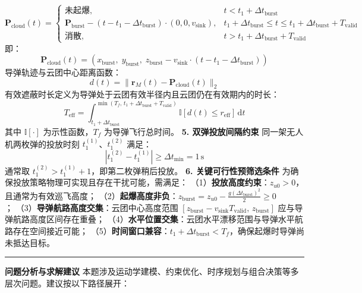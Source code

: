 \documentclass{JXUSTmodeling}
\begin{document}
\begin{equation}
\mathbf{P}_{\text{cloud}}(t) = \begin{cases} \text{未起爆}, & t < t_1 + \Delta t_{\text{burst}} \\ \mathbf{P}_{\text{burst}} - (t-t_1-\Delta t_{\text{burst}})\cdot(0,0,v_{\text{sink}}), & t_1 + \Delta t_{\text{burst}} \leq t \leq t_1 + \Delta t_{\text{burst}} + T_{\text{valid}} \\ \text{消散}, & t > t_1 + \Delta t_{\text{burst}} + T_{\text{valid}} \end{cases} \tag{11}
\end{equation}
即：
\begin{equation}
\mathbf{P}_{\text{cloud}}(t) = \left(x_{\text{burst}},\; y_{\text{burst}},\; z_{\text{burst}} - v_{\text{sink}}\cdot(t-t_1-\Delta t_{\text{burst}})\right) \tag{12}
\end{equation}
导弹轨迹与云团中心距离函数：
\begin{equation}
d(t) = \|\mathbf{r}_M(t) - \mathbf{P}_{\text{cloud}}(t)\|_2 \tag{13}
\end{equation}
有效遮蔽时长定义为导弹处于云团有效半径内且云团仍在有效期内的时长：
\begin{equation}
T_{\text{eff}} = \int_{t_1+\Delta t_{\text{burst}}}^{\min(T_f,\,t_1+\Delta t_{\text{burst}}+T_{\text{valid}})} \mathbb{I}\left[d(t) \leq r_{\text{eff}}\right]\,\mathrm{d}t \tag{14}
\end{equation}
其中 $\mathbb{I}[\cdot]$ 为示性函数，$T_f$ 为导弹飞行总时间。
\textbf{5. 双弹投放间隔约束}
同一架无人机两枚弹的投放时刻 $t_1^{(1)}$、$t_1^{(2)}$ 满足：
\begin{equation}
|t_1^{(2)} - t_1^{(1)}| \geq \Delta t_{\min} = 1\,\text{s} \tag{15}
\end{equation}
通常取 $t_1^{(2)} > t_1^{(1)} + 1$，即第二枚弹稍后投放。
\textbf{6. 关键可行性预筛选条件}
为确保投放策略物理可实现且存在干扰可能，需满足：
（1）\textbf{投放高度约束}：$z_{u0} > 0$，且通常为有效巡飞高度；
（2）\textbf{起爆高度非负}：$z_{\text{burst}} = z_{u0} - \frac{g(\Delta t_{\text{burst}})^2}{2} \geq 0$；
（3）\textbf{导弹航路高度交集}：云团中心高度范围 $[z_{\text{burst}}-v_{\text{sink}}T_{\text{valid}},\, z_{\text{burst}}]$ 应与导弹航路高度区间存在重叠；
（4）\textbf{水平位置交集}：云团水平漂移范围与导弹水平航路存在空间接近可能；
（5）\textbf{时间窗口兼容}：$t_1 + \Delta t_{\text{burst}} < T_f$，确保起爆时导弹尚未抵达目标。
\noindent\rule{\textwidth}{0.4pt}
\textbf{问题分析与求解建议}
本题涉及运动学建模、约束优化、时序规划与组合决策等多层次问题。建议按以下路径展开：
\end{document}
